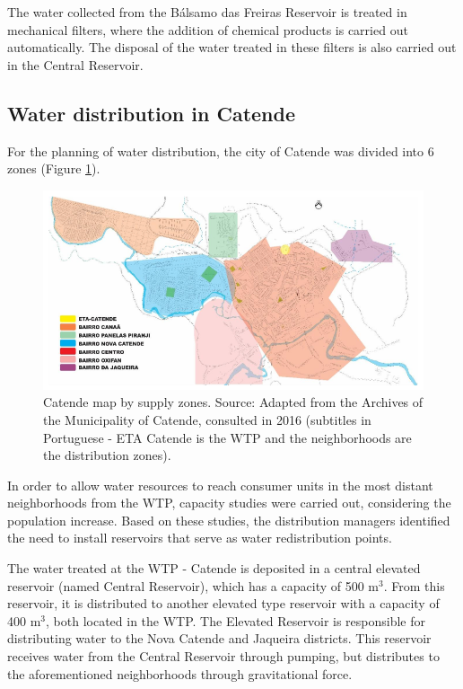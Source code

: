\documentclass{singlecol}
\theoremstyle{TH}{
\newtheorem{lemma}{Lemma}
\newtheorem{theorem}[lemma]{Theorem}
\newtheorem{corrolary}[lemma]{Corrolary}
\newtheorem{conjecture}[lemma]{Conjecture}
\newtheorem{proposition}[lemma]{Proposition}
\newtheorem{claim}[lemma]{Claim}
\newtheorem{stheorem}[lemma]{Wrong Theorem}
\newtheorem{algorithm}{Algorithm}
}
\theoremstyle{THrm}{
\newtheorem{definition}{Definition}[section]
\newtheorem{question}{Question}[section]
\newtheorem{remark}{Remark}
\newtheorem{scheme}{Scheme}
}
\theoremstyle{THhit}{
\newtheorem{case}{Case}[section]
}
\begin{document}
The water collected from the Bálsamo das Freiras Reservoir is treated in mechanical filters, where the addition of chemical products is carried out automatically. The disposal of the water treated in these filters is also carried out in the Central Reservoir. 

\subsection{Water distribution in Catende}

For the planning of water distribution, the city of Catende was divided into 6 zones (Figure \ref{fig:SectorsCatende}). 

\begin{figure}[h]
\caption{Catende map by supply zones. Source: Adapted from the Archives of the Municipality of Catende, consulted in 2016 (subtitles in Portuguese - ETA Catende is the WTP and the neighborhoods are the distribution zones).}
\label{fig:SectorsCatende}
\centering
\includegraphics[width=\textwidth]{figures/setores.png}
\end{figure}
 
In order to allow water resources to reach consumer units in the most distant neighborhoods from the WTP, capacity studies were carried out, considering the population increase. Based on these studies, the distribution managers identified the need to install reservoirs that serve as water redistribution points. 

The water treated at the WTP - Catende is deposited in a central elevated reservoir (named Central Reservoir), which has a capacity of 500 m$^3$. From this reservoir, it is distributed to another elevated type reservoir with a capacity of 400 m$^3$, both located in the WTP. The Elevated Reservoir is responsible for distributing water to the Nova Catende and Jaqueira districts. This reservoir receives water from the
Central Reservoir through pumping, but distributes to the aforementioned neighborhoods through gravitational force. 
\end{document}
